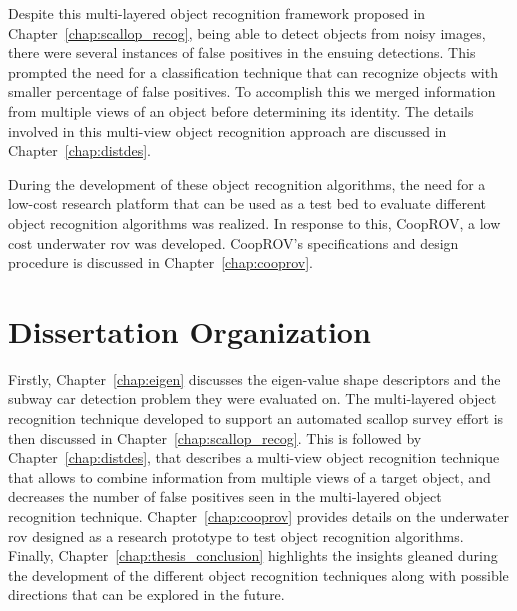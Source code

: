 Despite this multi-layered object recognition framework proposed in Chapter~\ref{chap:scallop_recog}, being able to detect objects from noisy images, there were 
several instances of false positives in the ensuing detections. This prompted the need for a classification technique that can recognize objects with smaller percentage of
false positives. To accomplish this we merged information from multiple views of an object before determining its identity. The details involved in this
multi-view object recognition approach are discussed in Chapter~\ref{chap:distdes}.

During the development of these object recognition algorithms, the need for a low-cost research platform 
that can be used as a test bed to evaluate different object recognition algorithms was realized.
In response to this, CoopROV, a low cost underwater \gls{rov} was developed. CoopROV's specifications and 
design procedure is discussed in Chapter~\ref{chap:cooprov}.

\section{Dissertation Organization}

Firstly, Chapter~\ref{chap:eigen} discusses the eigen-value shape descriptors and the subway car detection problem they were evaluated on.
The multi-layered object recognition technique developed to support an automated scallop survey effort 
is then discussed in Chapter~\ref{chap:scallop_recog}.
This is followed by Chapter~\ref{chap:distdes}, that describes a multi-view object recognition technique that allows to combine information from multiple views of a target object, and decreases the number of false positives seen in the multi-layered object recognition technique.
Chapter~\ref{chap:cooprov} provides details on the underwater \gls{rov} designed as a research prototype to test object recognition algorithms.
Finally, Chapter~\ref{chap:thesis_conclusion} highlights the insights gleaned during the development of the different object recognition techniques along with possible directions that can be explored in the future.

